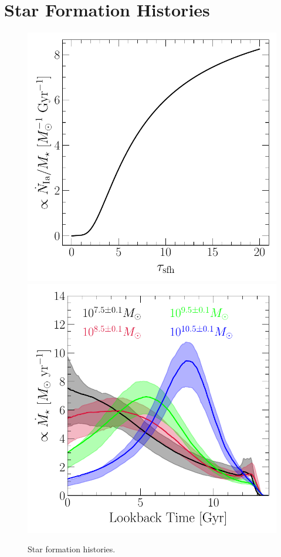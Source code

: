 \documentclass[ms.tex]{subfiles}
\begin{document}
\section{Star Formation Histories}
\label{sec:sfhs}

\begin{figure}
\centering
\includegraphics[scale = 0.6]{iarate_vs_tausfh.pdf}
\includegraphics[scale = 0.6]{umachine_sfhs.pdf}
\caption{Star formation histories.}
\label{fig:sfhs}
\end{figure}
\end{document}
